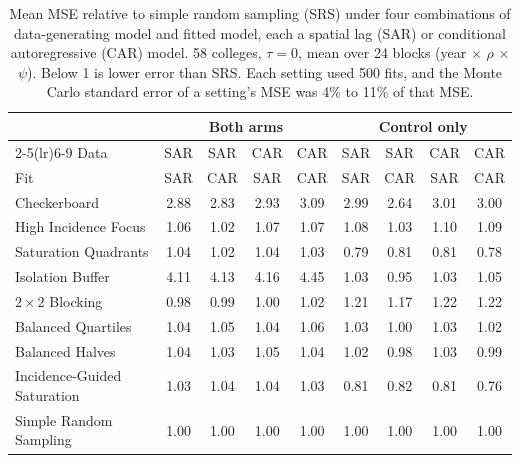 \documentclass[11pt]{article}
\begin{document}
\begin{table}[!htb]
\small
\centering
\caption{Mean MSE relative to simple random sampling (SRS) under four combinations of data-generating model and fitted model, each a spatial lag (SAR) or conditional autoregressive (CAR) model. 58 colleges, $\tau = 0$, mean over 24 blocks (year $\times$ $\rho$ $\times$ $\psi$). Below 1 is lower error than SRS. Each setting used 500 fits, and the Monte Carlo standard error of a setting's MSE was 4\% to 11\% of that MSE.}
\label{tab:nc-car}
\begin{tabular}{lcccccccc}
\toprule
& \multicolumn{4}{c}{Both arms} & \multicolumn{4}{c}{Control only} \\
\cmidrule(lr){2-5}\cmidrule(lr){6-9}
Data & SAR & SAR & CAR & CAR & SAR & SAR & CAR & CAR \\
Fit & SAR & CAR & SAR & CAR & SAR & CAR & SAR & CAR \\
\midrule
Checkerboard & 2.88 & 2.83 & 2.93 & 3.09 & 2.99 & 2.64 & 3.01 & 3.00 \\
High Incidence Focus & 1.06 & 1.02 & 1.07 & 1.07 & 1.08 & 1.03 & 1.10 & 1.09 \\
Saturation Quadrants & 1.04 & 1.02 & 1.04 & 1.03 & 0.79 & 0.81 & 0.81 & 0.78 \\
Isolation Buffer & 4.11 & 4.13 & 4.16 & 4.45 & 1.03 & 0.95 & 1.03 & 1.05 \\
$2\times2$ Blocking & 0.98 & 0.99 & 1.00 & 1.02 & 1.21 & 1.17 & 1.22 & 1.22 \\
Balanced Quartiles & 1.04 & 1.05 & 1.04 & 1.06 & 1.03 & 1.00 & 1.03 & 1.02 \\
Balanced Halves & 1.04 & 1.03 & 1.05 & 1.04 & 1.02 & 0.98 & 1.03 & 0.99 \\
Incidence-Guided Saturation & 1.03 & 1.04 & 1.04 & 1.03 & 0.81 & 0.82 & 0.81 & 0.76 \\
Simple Random Sampling & 1.00 & 1.00 & 1.00 & 1.00 & 1.00 & 1.00 & 1.00 & 1.00 \\
\bottomrule
\end{tabular}
\end{table}
\end{document}
